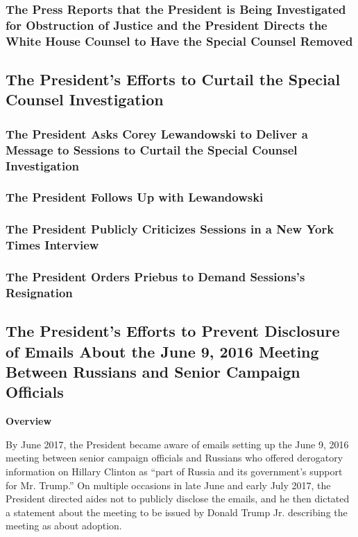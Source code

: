\subsubsection{The Press Reports that the President is Being Investigated for Obstruction of Justice and the President Directs the White House Counsel to Have the Special Counsel Removed}

\subsection{The President's Efforts to Curtail the Special Counsel Investigation}

\subsubsection{The President Asks Corey Lewandowski to Deliver a Message to Sessions to Curtail the Special Counsel Investigation}

\subsubsection{The President Follows Up with Lewandowski}

\subsubsection{The President Publicly Criticizes Sessions in a New York Times Interview}

\subsubsection{The President Orders Priebus to Demand Sessions's Resignation}

\subsection{The President's Efforts to Prevent Disclosure of Emails About the June 9, 2016 Meeting Between Russians and Senior Campaign Officials}

\begin{center}
\textbf{Overview}
\end{center}

By June 2017, the President became aware of emails setting up the June 9, 2016 meeting between senior campaign officials and Russians who offered derogatory information on Hillary Clinton as “part of Russia and its government's support for Mr. Trump.”
On multiple occasions in late June and early July 2017, the President directed aides not to publicly disclose the emails, and he then dictated a statement about the meeting to be issued by Donald Trump Jr. describing the meeting as about adoption.

